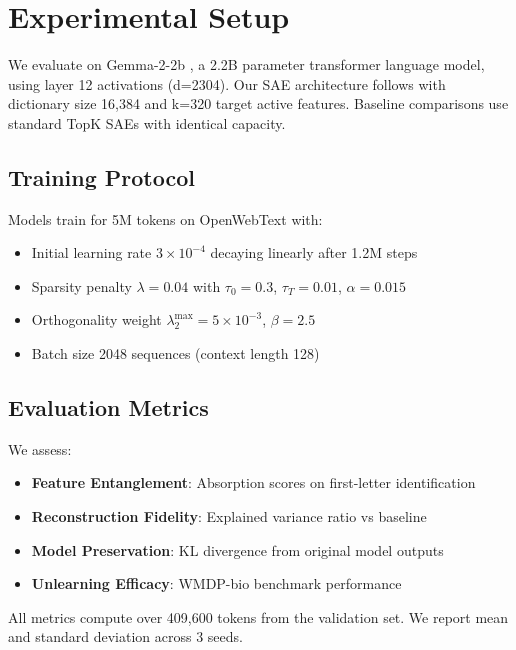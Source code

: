 \documentclass{article} %
\begin{document}
\section{Experimental Setup}
\label{sec:experimental}
We evaluate on Gemma-2-2b \cite{liWMDPBenchmarkMeasuring2024}, a 2.2B parameter transformer language model, using layer 12 activations (d=2304). Our SAE architecture follows \cite{bussmannBatchTopKSparseAutoencoders2024} with dictionary size 16,384 and k=320 target active features. Baseline comparisons use standard TopK SAEs with identical capacity.

\subsection{Training Protocol}
Models train for 5M tokens on OpenWebText \cite{radford2019language} with:
\begin{itemize}
    \item Initial learning rate $3\times10^{-4}$ decaying linearly after 1.2M steps
    \item Sparsity penalty $\lambda=0.04$ with $\tau_0=0.3$, $\tau_T=0.01$, $\alpha=0.015$
    \item Orthogonality weight $\lambda_2^{\max}=5\times10^{-3}$, $\beta=2.5$
    \item Batch size 2048 sequences (context length 128)
\end{itemize}

\subsection{Evaluation Metrics}
We assess:
\begin{itemize}
    \item \textbf{Feature Entanglement}: Absorption scores \cite{chaninAbsorptionStudyingFeature2024} on first-letter identification
    \item \textbf{Reconstruction Fidelity}: Explained variance ratio vs baseline
    \item \textbf{Model Preservation}: KL divergence from original model outputs
    \item \textbf{Unlearning Efficacy}: WMDP-bio benchmark performance \cite{liWMDPBenchmarkMeasuring2024}
\end{itemize}

All metrics compute over 409,600 tokens from the validation set. We report mean and standard deviation across 3 seeds.
\end{document}
